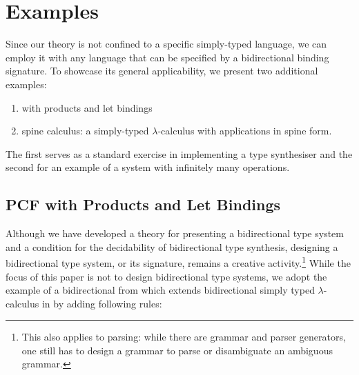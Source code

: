
\section{Examples}\label{sec:example}
Since our theory is not confined to a specific simply-typed language, we can employ it with any language that can be specified by a bidirectional binding signature.
To showcase its general applicability, we present two additional examples:
\begin{enumerate}
\item \PCF with products and let bindings
\item spine calculus: a simply-typed $\lambda$-calculus with applications in spine form.
\end{enumerate}
The first serves as a standard exercise in implementing a type synthesiser and the second for an example of a system with infinitely many operations.

\subsection{PCF with Products and Let Bindings}\label{subsec:PCF}
Although we have developed a theory for presenting a bidirectional type system and a condition for the decidability of bidirectional type synthesis, designing a bidirectional type system, or its signature, remains a creative activity.\footnote{This also applies to parsing: while there are grammar and parser generators, one still has to design a grammar to parse or disambiguate an ambiguous grammar.}
While the focus of this paper is not to design bidirectional type systems, we adopt the example of a bidirectional \PCF from \citet{Wadler2022} which extends bidirectional simply typed $\lambda$-calculus in  by adding following rules:
\bgroup
\small
\egroup

